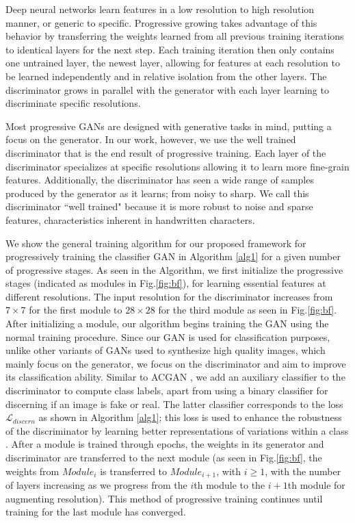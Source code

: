 \documentclass[runningheads]{llncs}
\begin{document}
Deep neural networks learn features in a low resolution to high resolution manner, or generic to specific. Progressive growing takes advantage of this behavior by transferring the weights learned from all previous training iterations to identical layers for the next step. Each training iteration then only contains one untrained layer, the newest layer, allowing for features at each resolution to be learned independently and in relative isolation from the other layers. The discriminator grows in parallel with the generator with each layer learning to discriminate specific resolutions.

Most progressive GANs are designed with generative tasks in mind, putting a focus on the generator. In our work, however, we use the well trained discriminator that is the end result of progressive training. Each layer of the discriminator specializes at specific resolutions allowing it to learn more fine-grain features. Additionally, the discriminator has seen a wide range of samples produced by the generator as it learns; from noisy to sharp. We call this discriminator ``well trained" because it is more robust to noise and sparse features, characteristics inherent in handwritten characters.

We show the general  training algorithm for our proposed framework for progressively  training the classifier GAN   in Algorithm \ref{alg1} for a given number of progressive stages. As seen in the Algorithm, we first initialize the progressive stages (indicated as  modules in Fig.\ref{fig:bf}), for learning essential features at different resolutions. The input resolution for  the discriminator increases from $7 \times 7$ for the first module   to $28 \times 28$ for the third module as seen in  Fig.\ref{fig:bf}. After initializing a  module, our algorithm begins training the GAN using the  normal training procedure. Since our GAN is used for classification purposes, unlike other variants of GANs used to synthesize high quality images, which mainly focus on  the generator,  we  focus on the  discriminator and aim to improve its classification ability. Similar to  ACGAN \cite{google},  we add an auxiliary classifier  to  the discriminator to compute class labels, apart from  using a  binary classifier   for discerning if an image is fake or real. The latter classifier corresponds to the loss $\mathcal{L}_{discern}$ as shown in Algorithm \ref{alg1}; this loss is used to enhance the robustness of the discriminator by learning better representations of variations within a class \cite{hariharan2017low}. After a module is trained through epochs, the weights in its generator and discriminator are transferred to the next module (as seen in Fig.\ref{fig:bf}, the weights from $\mathit{Module}_i$ is transferred to  $\mathit{Module}_{i+1}$, with $i \geq 1$, with the number of layers increasing as we progress from the $i$th module to the $i+1$th module for augmenting resolution). This method of progressive training continues until training for the last module has converged.
\end{document}
